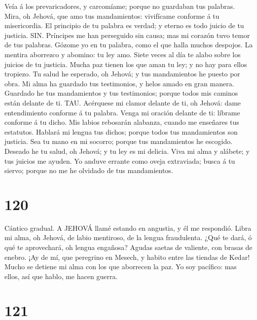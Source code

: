  Veía á los prevaricadores, y carcomíame; porque no
guardaban tus palabras.  Mira, oh Jehová, que amo tus
mandamientos: vivifícame conforme á tu misericordia.  El
principio de tu palabra es verdad; y eterno es todo juicio de tu
justicia.  SIN. Príncipes me han perseguido sin causa; mas
mi corazón tuvo temor de tus palabras.  Gózome yo en tu
palabra, como el que halla muchos despojos.  La mentira
aborrezco y abomino: tu ley amo.  Siete veces al día te
alabo sobre los juicios de tu justicia.  Mucha paz tienen
los que aman tu ley; y no hay para ellos tropiezo.  Tu
salud he esperado, oh Jehová; y tus mandamientos he puesto por obra.
 Mi alma ha guardado tus testimonios, y helos amado en
gran manera.  Guardado he tus mandamientos y tus
testimonios; porque todos mis caminos están delante de ti.
 TAU. Acérquese mi clamor delante de ti, oh Jehová: dame
entendimiento conforme á tu palabra.  Venga mi oración
delante de ti: líbrame conforme á tu dicho.  Mis labios
rebosarán alabanza, cuando me enseñares tus estatutos. 
Hablará mi lengua tus dichos; porque todos tus mandamientos son
justicia.  Sea tu mano en mi socorro; porque tus
mandamientos he escogido.  Deseado he tu salud, oh Jehová;
y tu ley es mi delicia.  Viva mi alma y alábete; y tus
juicios me ayuden.  Yo anduve errante como oveja
extraviada; busca á tu siervo; porque no me he olvidado de tus
mandamientos.

\hypertarget{section-119}{%
\section{120}\label{section-119}}

 Cántico gradual. A JEHOVÁ llamé estando en angustia, y él
me respondió.  Libra mi alma, oh Jehová, de labio mentiroso,
de la lengua fraudulenta.  ¿Qué te dará, ó qué te
aprovechará, oh lengua engañosa?  Agudas saetas de valiente,
con brasas de enebro.  ¡Ay de mí, que peregrino en Mesech, y
habito entre las tiendas de Kedar!  Mucho se detiene mi alma
con los que aborrecen la paz.  Yo soy pacífico: mas ellos,
así que hablo, me hacen guerra.

\hypertarget{section-120}{%
\section{121}\label{section-120}}

